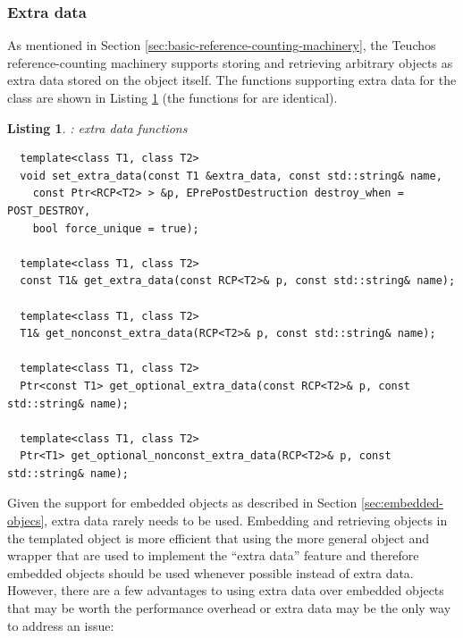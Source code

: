 \documentclass[pdf,ps2pdf,11pt]{SANDreport}
\newtheorem{listing}{Listing}
\begin{document}
%
{}\subsubsection{Extra data}
\label{sec:extra-data}
%

As mentioned in Section
{}\ref{sec:basic-reference-counting-machinery}, the Teuchos
reference-counting machinery supports storing and retrieving arbitrary
objects as extra data stored on the {} object itself.
The functions supporting extra data for the {} class are
shown in Listing {}\ref{listing:RCP-extra-data} (the functions for
{} are identical).

\begin{listing}:  {} extra data functions \\
\label{listing:RCP-extra-data}
{\small\begin{verbatim}
  template<class T1, class T2>
  void set_extra_data(const T1 &extra_data, const std::string& name,
    const Ptr<RCP<T2> > &p, EPrePostDestruction destroy_when = POST_DESTROY,
    bool force_unique = true);
  
  template<class T1, class T2> 
  const T1& get_extra_data(const RCP<T2>& p, const std::string& name);
  
  template<class T1, class T2>
  T1& get_nonconst_extra_data(RCP<T2>& p, const std::string& name);
  
  template<class T1, class T2>
  Ptr<const T1> get_optional_extra_data(const RCP<T2>& p, const std::string& name);
  
  template<class T1, class T2>
  Ptr<T1> get_optional_nonconst_extra_data(RCP<T2>& p, const std::string& name);
\end{verbatim}}
\end{listing}

Given the support for embedded objects as described in Section
{}\ref{sec:embedded-objecs}, extra data rarely needs to be used.
Embedding and retrieving objects in the templated
{} object is more efficient that using the more
general {} object and {} wrapper that are
used to implement the ``extra data'' feature and therefore embedded
objects should be used whenever possible instead of extra data.
However, there are a few advantages to using extra data over embedded
objects that may be worth the performance overhead or extra data may
be the only way to address an issue:
\end{document}
